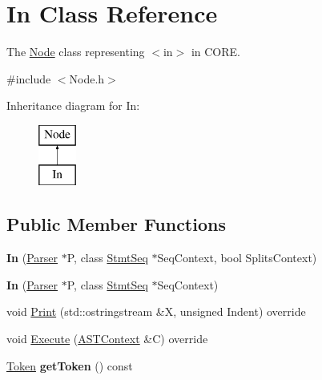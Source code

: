 \hypertarget{class_in}{}\section{In Class Reference}
\label{class_in}


The \mbox{\hyperlink{class_node}{Node}} class representing {\ttfamily $<$in$>$} in C\+O\+RE.  




{\ttfamily \#include $<$Node.\+h$>$}

Inheritance diagram for In\+:\begin{figure}[H]
\begin{center}
\leavevmode
\includegraphics[height=2.000000cm]{class_in}
\end{center}
\end{figure}
\subsection*{Public Member Functions}
\begin{DoxyCompactItemize}
\item 
\mbox{\label{class_in_a4ded9b64c9b00237aa852669290572b5}} 
{\bfseries In} (\mbox{\hyperlink{class_parser}{Parser}} $\ast$P, class \mbox{\hyperlink{class_stmt_seq}{Stmt\+Seq}} $\ast$Seq\+Context, bool Splits\+Context)
\item 
\mbox{\label{class_in_a1a19750150a54c96af369b2d161d4949}} 
{\bfseries In} (\mbox{\hyperlink{class_parser}{Parser}} $\ast$P, class \mbox{\hyperlink{class_stmt_seq}{Stmt\+Seq}} $\ast$Seq\+Context)
\item 
void \mbox{\hyperlink{class_in_a309553a9aa17740ec97c110d8697e0a6}{Print}} (std\+::ostringstream \&X, unsigned Indent) override
\item 
void \mbox{\hyperlink{class_in_afb7785ea5139aea43adad662a1efc4c9}{Execute}} (\mbox{\hyperlink{class_a_s_t_context}{A\+S\+T\+Context}} \&C) override
\item 
\mbox{\label{class_in_a01bc7abf0617a341ed4e6caf99b85eff}} 
\mbox{\hyperlink{class_token}{Token}} {\bfseries get\+Token} () const
\end{DoxyCompactItemize}
